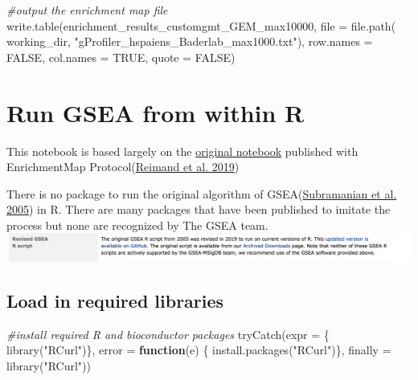 \documentclass[
]{book}
\newenvironment{Shaded}{\begin{snugshade}}{\end{snugshade}}
\newcommand{\AttributeTok}[1]{\textcolor[rgb]{0.77,0.63,0.00}{#1}}
\newcommand{\CommentTok}[1]{\textcolor[rgb]{0.56,0.35,0.01}{\textit{#1}}}
\newcommand{\ConstantTok}[1]{\textcolor[rgb]{0.00,0.00,0.00}{#1}}
\newcommand{\ControlFlowTok}[1]{\textcolor[rgb]{0.13,0.29,0.53}{\textbf{#1}}}
\newcommand{\FunctionTok}[1]{\textcolor[rgb]{0.00,0.00,0.00}{#1}}
\newcommand{\NormalTok}[1]{#1}
\newcommand{\StringTok}[1]{\textcolor[rgb]{0.31,0.60,0.02}{#1}}
\begin{document}
\begin{Shaded}
\begin{Highlighting}[]
\CommentTok{\#output the enrichment map file}
\FunctionTok{write.table}\NormalTok{(enrichment\_results\_customgmt\_GEM\_max10000, }
                  \AttributeTok{file =} \FunctionTok{file.path}\NormalTok{(}
\NormalTok{                    working\_dir, }\StringTok{"gProfiler\_hspaiens\_Baderlab\_max1000.txt"}\NormalTok{),}
                  \AttributeTok{row.names =} \ConstantTok{FALSE}\NormalTok{, }
                  \AttributeTok{col.names =} \ConstantTok{TRUE}\NormalTok{,}
                  \AttributeTok{quote =} \ConstantTok{FALSE}\NormalTok{)}
\end{Highlighting}
\end{Shaded}

\hypertarget{run-gsea-from-within-r}{%
\chapter{Run GSEA from within R}\label{run-gsea-from-within-r}}

This notebook is based largely on the \href{https://baderlab.github.io/Cytoscape_workflows/EnrichmentMapPipeline/Protocol2_createEM.html}{original notebook} published with EnrichmentMap Protocol(\protect\hyperlink{ref-em2019}{Reimand et al. 2019})

There is no package to run the original algorithm of GSEA(\protect\hyperlink{ref-gsea2005}{Subramanian et al. 2005}) in R. There are many packages that have been published to imitate the process but none are recognized by The GSEA team.\\
\includegraphics{./images/gsea_r_package_message.png}

\hypertarget{load-in-required-libraries}{%
\section{Load in required libraries}\label{load-in-required-libraries}}

\begin{Shaded}
\begin{Highlighting}[]
\CommentTok{\#install required R and bioconductor packages}
\FunctionTok{tryCatch}\NormalTok{(}\AttributeTok{expr =}\NormalTok{ \{ }\FunctionTok{library}\NormalTok{(}\StringTok{"RCurl"}\NormalTok{)\}, }
         \AttributeTok{error =} \ControlFlowTok{function}\NormalTok{(e) \{  }
           \FunctionTok{install.packages}\NormalTok{(}\StringTok{"RCurl"}\NormalTok{)\}, }
         \AttributeTok{finally =} \FunctionTok{library}\NormalTok{(}\StringTok{"RCurl"}\NormalTok{))}
\end{Highlighting}
\end{Shaded}
\end{document}
